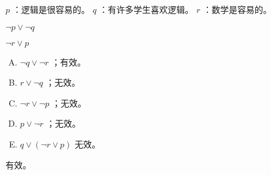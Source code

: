 {{        %
        \begin{practices}
            $p$ ：逻辑是很容易的。
            $q$ ：有许多学生喜欢逻辑。
            $r$ ：数学是容易的。

            $\neg p \vee \neg q$

            $\neg r \vee p$

            \begin{enumerate}[A.]
                \item $\neg q \vee \neg r$ ；有效。
                \item $r \vee \neg q$ ；无效。
                \item $\neg r \vee \neg p$ ；无效。
                \item $p \vee \neg r$ ；无效。
                \item $q \vee (\neg r \vee p)$ 无效。
            \end{enumerate}
        \end{practices}

        \begin{practices}
            有效。
        \end{practices}
    }
}
